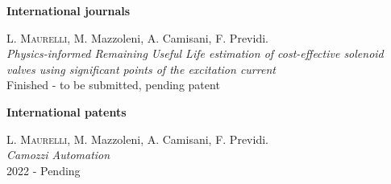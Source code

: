\documentclass[10pt]{article}
\newcommand{\cvsection}[1]{\section*{\centering\normalsize\uppercase{#1}}\vspace{-16pt}\rule{\linewidth}{0.2pt}\vspace{6pt}}
\begin{document}
\textbf{International journals}
\begin{enumerate}[label={[J0{\arabic*}]}]
	\setlength\itemsep{-3pt}
	\item \label{j2022}\textsc{L. Maurelli}, M. Mazzoleni, A. Camisani, F. Previdi.\\
	\textit{Physics-informed Remaining Useful Life estimation of cost-effective solenoid
	valves using significant points of the excitation current}\\
	Finished - to be submitted, pending patent
\end{enumerate}
\textbf{International patents}
\begin{enumerate}[label={[P0{\arabic*}]}]
	\setlength\itemsep{-3pt}
	\item \label{p2022}\textsc{L. Maurelli}, M. Mazzoleni, A. Camisani, F. Previdi.\\
	\textit{Camozzi Automation}\\
	2022 - Pending
\end{enumerate}




\end{document}
